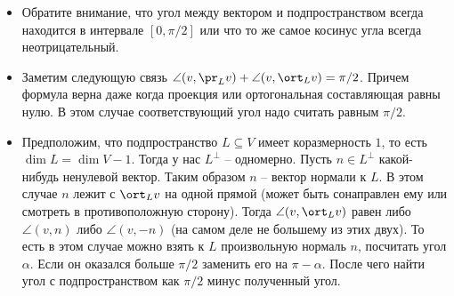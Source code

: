 \begin{itemize}
\item Обратите внимание, что угол между вектором и подпространством всегда находится в интервале $[0, \pi/2]$ или что то же самое косинус угла всегда неотрицательный.

\item Заметим следующую связь $\angle (v, \pr_L v) + \angle (v, \ort_L v) = \pi/2$.
Причем формула верна даже когда проекция или ортогональная составляющая равны нулю.
В этом случае соответствующий угол надо считать равным $\pi/2$.

\item Предположим, что подпространство $L\subseteq V$ имеет коразмерность $1$, то есть $\dim L = \dim V - 1$.
Тогда у нас $L^\bot$ -- одномерно.
Пусть $n\in L^\bot$ какой-нибудь ненулевой вектор.
Таким образом $n$ -- вектор нормали к $L$.
В этом случае $n$ лежит с $\ort_L v$ на одной прямой (может быть сонаправлен ему или смотреть в противоположную сторону).
Тогда $\angle (v, \ort_L v)$ равен либо $\angle (v, n)$ либо $\angle (v, - n)$ (на самом деле не большему из этих двух).
То есть в этом случае можно взять к $L$ произвольную нормаль $n$, посчитать угол $\alpha$.
Если он оказался больше $\pi/2$ заменить его на $\pi - \alpha$.
После чего найти угол с подпространством как $\pi/2$ минус полученный угол.
\end{itemize}
